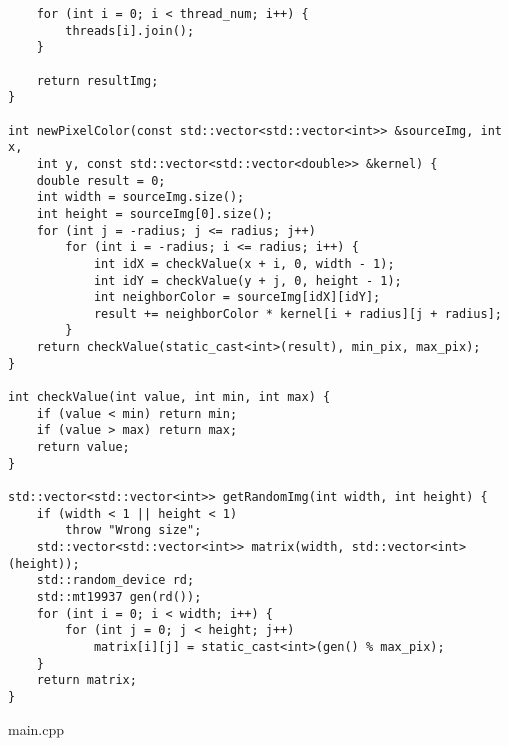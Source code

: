 \documentclass{report}
\begin{document}
\begin{lstlisting}
    for (int i = 0; i < thread_num; i++) {
        threads[i].join();
    }

    return resultImg;
}

int newPixelColor(const std::vector<std::vector<int>> &sourceImg, int x,
    int y, const std::vector<std::vector<double>> &kernel) {
    double result = 0;
    int width = sourceImg.size();
    int height = sourceImg[0].size();
    for (int j = -radius; j <= radius; j++)
        for (int i = -radius; i <= radius; i++) {
            int idX = checkValue(x + i, 0, width - 1);
            int idY = checkValue(y + j, 0, height - 1);
            int neighborColor = sourceImg[idX][idY];
            result += neighborColor * kernel[i + radius][j + radius];
        }
    return checkValue(static_cast<int>(result), min_pix, max_pix);
}

int checkValue(int value, int min, int max) {
    if (value < min) return min;
    if (value > max) return max;
    return value;
}

std::vector<std::vector<int>> getRandomImg(int width, int height) {
    if (width < 1 || height < 1)
        throw "Wrong size";
    std::vector<std::vector<int>> matrix(width, std::vector<int>(height));
    std::random_device rd;
    std::mt19937 gen(rd());
    for (int i = 0; i < width; i++) {
        for (int j = 0; j < height; j++)
            matrix[i][j] = static_cast<int>(gen() % max_pix);
    }
    return matrix;
}
\end{lstlisting}
\par main.cpp
\end{document}
